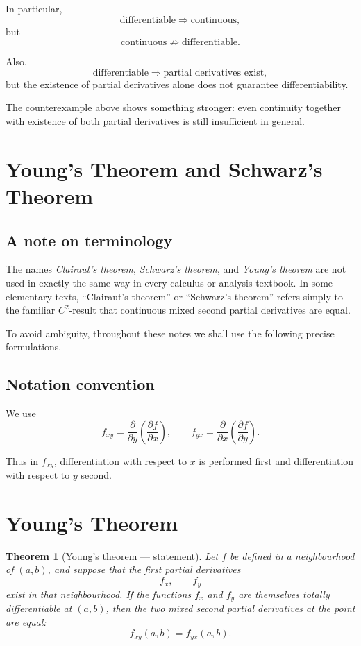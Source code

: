\documentclass[11pt,oneside]{book}
\theoremstyle{studentthm}
\newtheorem{theorem}{Theorem}[chapter]
\theoremstyle{definition}
\begin{document}
In particular,
\[
\text{differentiable}
\Longrightarrow
\text{continuous},
\]
but
\[
\text{continuous}
\not\Longrightarrow
\text{differentiable}.
\]

Also,
\[
\text{differentiable}
\Longrightarrow
\text{partial derivatives exist},
\]
but the existence of partial derivatives alone does not guarantee
differentiability.

The counterexample above shows something stronger:
even continuity together with existence of both partial derivatives is
still insufficient in general.



\section{Young's Theorem and Schwarz's Theorem}

\subsection*{A note on terminology}

The names \emph{Clairaut's theorem}, \emph{Schwarz's theorem}, and
\emph{Young's theorem} are not used in exactly the same way in every
calculus or analysis textbook. In some elementary texts, ``Clairaut's
theorem'' or ``Schwarz's theorem'' refers simply to the familiar
\(C^2\)-result that continuous mixed second partial derivatives are
equal.

To avoid ambiguity, throughout these notes we shall use the following
precise formulations.

\subsection*{Notation convention}

We use
\[
f_{xy}
=
\frac{\partial}{\partial y}
\left(
\frac{\partial f}{\partial x}
\right),
\qquad
f_{yx}
=
\frac{\partial}{\partial x}
\left(
\frac{\partial f}{\partial y}
\right).
\]

Thus in \(f_{xy}\), differentiation with respect to \(x\) is performed
first and differentiation with respect to \(y\) second.

\section{Young's Theorem}

\begin{theorem}[Young's theorem --- statement]
Let \(f\) be defined in a neighbourhood of \((a,b)\), and suppose that
the first partial derivatives
\[
f_x,\qquad f_y
\]
exist in that neighbourhood. If the functions \(f_x\) and \(f_y\)
are themselves totally differentiable at \((a,b)\), then the two
mixed second partial derivatives at the point are equal:
\[
f_{xy}(a,b)=f_{yx}(a,b).
\]
\end{theorem}
\end{document}
